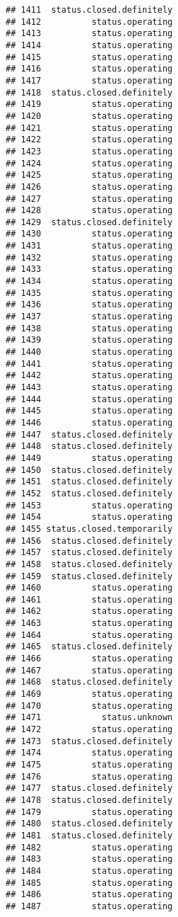 \documentclass[
]{article}
\begin{document}
\begin{verbatim}
## 1411  status.closed.definitely
## 1412          status.operating
## 1413          status.operating
## 1414          status.operating
## 1415          status.operating
## 1416          status.operating
## 1417          status.operating
## 1418  status.closed.definitely
## 1419          status.operating
## 1420          status.operating
## 1421          status.operating
## 1422          status.operating
## 1423          status.operating
## 1424          status.operating
## 1425          status.operating
## 1426          status.operating
## 1427          status.operating
## 1428          status.operating
## 1429  status.closed.definitely
## 1430          status.operating
## 1431          status.operating
## 1432          status.operating
## 1433          status.operating
## 1434          status.operating
## 1435          status.operating
## 1436          status.operating
## 1437          status.operating
## 1438          status.operating
## 1439          status.operating
## 1440          status.operating
## 1441          status.operating
## 1442          status.operating
## 1443          status.operating
## 1444          status.operating
## 1445          status.operating
## 1446          status.operating
## 1447  status.closed.definitely
## 1448  status.closed.definitely
## 1449          status.operating
## 1450  status.closed.definitely
## 1451  status.closed.definitely
## 1452  status.closed.definitely
## 1453          status.operating
## 1454          status.operating
## 1455 status.closed.temporarily
## 1456  status.closed.definitely
## 1457  status.closed.definitely
## 1458  status.closed.definitely
## 1459  status.closed.definitely
## 1460          status.operating
## 1461          status.operating
## 1462          status.operating
## 1463          status.operating
## 1464          status.operating
## 1465  status.closed.definitely
## 1466          status.operating
## 1467          status.operating
## 1468  status.closed.definitely
## 1469          status.operating
## 1470          status.operating
## 1471            status.unknown
## 1472          status.operating
## 1473  status.closed.definitely
## 1474          status.operating
## 1475          status.operating
## 1476          status.operating
## 1477  status.closed.definitely
## 1478  status.closed.definitely
## 1479          status.operating
## 1480  status.closed.definitely
## 1481  status.closed.definitely
## 1482          status.operating
## 1483          status.operating
## 1484          status.operating
## 1485          status.operating
## 1486          status.operating
## 1487          status.operating

\end{verbatim}
\end{document}
